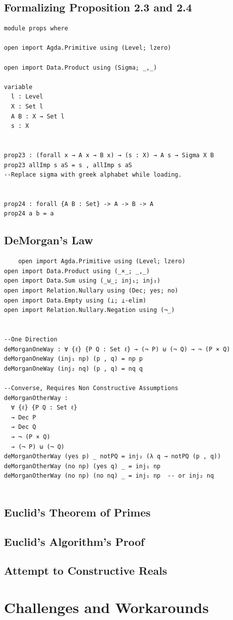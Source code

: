 \documentclass[12pt]{article}
\begin{document}
\subsection{Formalizing Proposition 2.3 and 2.4 }
\begin{verbatim}
module props where

open import Agda.Primitive using (Level; lzero)

open import Data.Product using (Sigma; _,_)

variable
  l : Level
  X : Set l
  A B : X → Set l
  s : X


prop23 : (forall x → A x → B x) → (s : X) → A s → Sigma X B
prop23 allImp s aS = s , allImp s aS
--Replace sigma with greek alphabet while loading.


prop24 : forall {A B : Set} -> A -> B -> A
prop24 a b = a
\end{verbatim}

\subsection{DeMorgan's Law}
\begin{verbatim}
    open import Agda.Primitive using (Level; lzero)
open import Data.Product using (_×_; _,_)
open import Data.Sum using (_⊎_; inj₁; inj₂)
open import Relation.Nullary using (Dec; yes; no)
open import Data.Empty using (⊥; ⊥-elim)
open import Relation.Nullary.Negation using (¬_)


--One Direction
deMorganOneWay : ∀ {ℓ} {P Q : Set ℓ} → (¬ P) ⊎ (¬ Q) → ¬ (P × Q)
deMorganOneWay (inj₁ np) (p , q) = np p
deMorganOneWay (inj₂ nq) (p , q) = nq q

--Converse, Requires Non Constructive Assumptions
deMorganOtherWay :
  ∀ {ℓ} {P Q : Set ℓ}
  → Dec P
  → Dec Q
  → ¬ (P × Q)
  → (¬ P) ⊎ (¬ Q)
deMorganOtherWay (yes p) _ notPQ = inj₂ (λ q → notPQ (p , q))
deMorganOtherWay (no np) (yes q) _ = inj₁ np
deMorganOtherWay (no np) (no nq) _ = inj₁ np  -- or inj₂ nq


\end{verbatim}
\subsection{Euclid's Theorem of Primes }



\subsection{Euclid's Algorithm's Proof}

\subsection{Attempt to Constructive Reals}






 

\section{Challenges and Workarounds}





 

\end{document}
